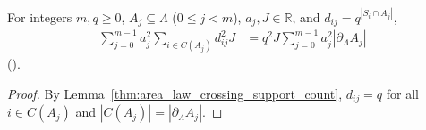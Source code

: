 \begin{lemma}
    \label{thm:area_law_nearest_neighbor_budget}
    \leanok
    For integers $m,q\ge0$, $A_j\subseteq\Lambda$ ($0\le j<m$), $a_j,J\in\mathbb R$, and $d_{ij}=q^{|S_i\cap A_j|}$,
    \begin{align}
        \sum_{j=0}^{m-1}a_j^2\sum_{i\in C(A_j)}d_{ij}^2J
         & =q^2J\sum_{j=0}^{m-1}a_j^2|\partial_\Lambda A_j|
        \label{eq:area_law_exact_crossing_sum}
    \end{align}
    (\cite[Section~4]{OpenAI2026PolynomialPEPS}).
\end{lemma}
\begin{proof}
    \leanok
    By Lemma~\ref{thm:area_law_crossing_support_count}, $d_{ij}=q$ for all $i\in C(A_j)$ and $|C(A_j)|=|\partial_\Lambda A_j|$.
\end{proof}

